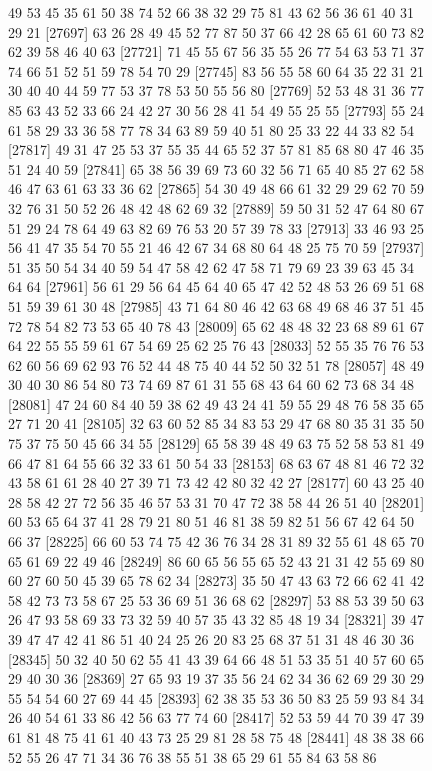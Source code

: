 \documentclass{article}
\begin{document}
\begin{figure}[H]
\begin{Schunk}
\begin{Soutput}
[27673] 49 53 45 35 61 50 38 74 52 66 38 32 29 75 81 43 62 56 36 61 40 31 29 21
[27697] 63 26 28 49 45 52 77 87 50 37 66 42 28 65 61 60 73 82 62 39 58 46 40 63
[27721] 71 45 55 67 56 35 55 26 77 54 63 53 71 37 74 66 51 52 51 59 78 54 70 29
[27745] 83 56 55 58 60 64 35 22 31 21 30 40 40 44 59 77 53 37 78 53 50 55 56 80
[27769] 52 53 48 31 36 77 85 63 43 52 33 66 24 42 27 30 56 28 41 54 49 55 25 55
[27793] 55 24 61 58 29 33 36 58 77 78 34 63 89 59 40 51 80 25 33 22 44 33 82 54
[27817] 49 31 47 25 53 37 55 35 44 65 52 37 57 81 85 68 80 47 46 35 51 24 40 59
[27841] 65 38 56 39 69 73 60 32 56 71 65 40 85 27 62 58 46 47 63 61 63 33 36 62
[27865] 54 30 49 48 66 61 32 29 29 62 70 59 32 76 31 50 52 26 48 42 48 62 69 32
[27889] 59 50 31 52 47 64 80 67 51 29 24 78 64 49 63 82 69 76 53 20 57 39 78 33
[27913] 33 46 93 25 56 41 47 35 54 70 55 21 46 42 67 34 68 80 64 48 25 75 70 59
[27937] 51 35 50 54 34 40 59 54 47 58 42 62 47 58 71 79 69 23 39 63 45 34 64 64
[27961] 56 61 29 56 64 45 64 40 65 47 42 52 48 53 26 69 51 68 51 59 39 61 30 48
[27985] 43 71 64 80 46 42 63 68 49 68 46 37 51 45 72 78 54 82 73 53 65 40 78 43
[28009] 65 62 48 48 32 23 68 89 61 67 64 22 55 55 59 61 67 54 69 25 62 25 76 43
[28033] 52 55 35 76 76 53 62 60 56 69 62 93 76 52 44 48 75 40 44 52 50 32 51 78
[28057] 48 49 30 40 30 86 54 80 73 74 69 87 61 31 55 68 43 64 60 62 73 68 34 48
[28081] 47 24 60 84 40 59 38 62 49 43 24 41 59 55 29 48 76 58 35 65 27 71 20 41
[28105] 32 63 60 52 85 34 83 53 29 47 68 80 35 31 35 50 75 37 75 50 45 66 34 55
[28129] 65 58 39 48 49 63 75 52 58 53 81 49 66 47 81 64 55 66 32 33 61 50 54 33
[28153] 68 63 67 48 81 46 72 32 43 58 61 61 28 40 27 39 71 73 42 42 80 32 42 27
[28177] 60 43 25 40 28 58 42 27 72 56 35 46 57 53 31 70 47 72 38 58 44 26 51 40
[28201] 60 53 65 64 37 41 28 79 21 80 51 46 81 38 59 82 51 56 67 42 64 50 66 37
[28225] 66 60 53 74 75 42 36 76 34 28 31 89 32 55 61 48 65 70 65 61 69 22 49 46
[28249] 86 60 65 56 55 65 52 43 21 31 42 55 69 80 60 27 60 50 45 39 65 78 62 34
[28273] 35 50 47 43 63 72 66 62 41 42 58 42 73 73 58 67 25 53 36 69 51 36 68 62
[28297] 53 88 53 39 50 63 26 47 93 58 69 33 73 32 59 40 57 35 43 32 85 48 19 34
[28321] 39 47 39 47 47 42 41 86 51 40 24 25 26 20 83 25 68 37 51 31 48 46 30 36
[28345] 50 32 40 50 62 55 41 43 39 64 66 48 51 53 35 51 40 57 60 65 29 40 30 36
[28369] 27 65 93 19 37 35 56 24 62 34 36 62 69 29 30 29 55 54 54 60 27 69 44 45
[28393] 62 38 35 53 36 50 83 25 59 93 84 34 26 40 54 61 33 86 42 56 63 77 74 60
[28417] 52 53 59 44 70 39 47 39 61 81 48 75 41 61 40 43 73 25 29 81 28 58 75 48
[28441] 48 38 38 66 52 55 26 47 71 34 36 76 38 55 51 38 65 29 61 55 84 63 58 86

\end{Soutput}
\end{Schunk}
\end{figure}
\end{document}
